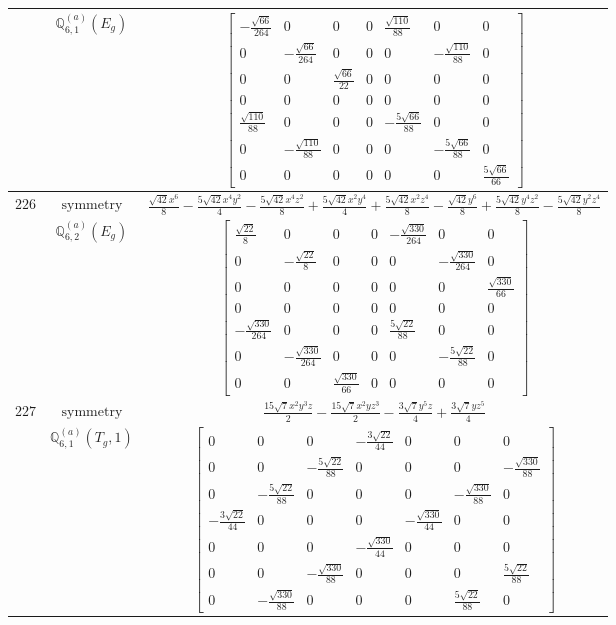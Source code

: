 \documentclass[fleqn,8pt,landscape]{jsarticle}
\begin{document}
\begin{longtable}{ccc}
$  $ & $ \mathbb{Q}_{6,1}^{(a)}(E_{g}) $ & $ \begin{bmatrix} - \frac{\sqrt{66}}{264} & 0 & 0 & 0 & \frac{\sqrt{110}}{88} & 0 & 0 \\ 0 & - \frac{\sqrt{66}}{264} & 0 & 0 & 0 & - \frac{\sqrt{110}}{88} & 0 \\ 0 & 0 & \frac{\sqrt{66}}{22} & 0 & 0 & 0 & 0 \\ 0 & 0 & 0 & 0 & 0 & 0 & 0 \\ \frac{\sqrt{110}}{88} & 0 & 0 & 0 & - \frac{5 \sqrt{66}}{88} & 0 & 0 \\ 0 & - \frac{\sqrt{110}}{88} & 0 & 0 & 0 & - \frac{5 \sqrt{66}}{88} & 0 \\ 0 & 0 & 0 & 0 & 0 & 0 & \frac{5 \sqrt{66}}{66} \end{bmatrix} $ \\ \hline
$ 226 $ & $ \text{symmetry} $ & $ \frac{\sqrt{42} x^{6}}{8} - \frac{5 \sqrt{42} x^{4} y^{2}}{4} - \frac{5 \sqrt{42} x^{4} z^{2}}{8} + \frac{5 \sqrt{42} x^{2} y^{4}}{4} + \frac{5 \sqrt{42} x^{2} z^{4}}{8} - \frac{\sqrt{42} y^{6}}{8} + \frac{5 \sqrt{42} y^{4} z^{2}}{8} - \frac{5 \sqrt{42} y^{2} z^{4}}{8} $ \\
$  $ & $ \mathbb{Q}_{6,2}^{(a)}(E_{g}) $ & $ \begin{bmatrix} \frac{\sqrt{22}}{8} & 0 & 0 & 0 & - \frac{\sqrt{330}}{264} & 0 & 0 \\ 0 & - \frac{\sqrt{22}}{8} & 0 & 0 & 0 & - \frac{\sqrt{330}}{264} & 0 \\ 0 & 0 & 0 & 0 & 0 & 0 & \frac{\sqrt{330}}{66} \\ 0 & 0 & 0 & 0 & 0 & 0 & 0 \\ - \frac{\sqrt{330}}{264} & 0 & 0 & 0 & \frac{5 \sqrt{22}}{88} & 0 & 0 \\ 0 & - \frac{\sqrt{330}}{264} & 0 & 0 & 0 & - \frac{5 \sqrt{22}}{88} & 0 \\ 0 & 0 & \frac{\sqrt{330}}{66} & 0 & 0 & 0 & 0 \end{bmatrix} $ \\ \hline
$ 227 $ & $ \text{symmetry} $ & $ \frac{15 \sqrt{7} x^{2} y^{3} z}{2} - \frac{15 \sqrt{7} x^{2} y z^{3}}{2} - \frac{3 \sqrt{7} y^{5} z}{4} + \frac{3 \sqrt{7} y z^{5}}{4} $ \\
$  $ & $ \mathbb{Q}_{6,1}^{(a)}(T_{g},1) $ & $ \begin{bmatrix} 0 & 0 & 0 & - \frac{3 \sqrt{22}}{44} & 0 & 0 & 0 \\ 0 & 0 & - \frac{5 \sqrt{22}}{88} & 0 & 0 & 0 & - \frac{\sqrt{330}}{88} \\ 0 & - \frac{5 \sqrt{22}}{88} & 0 & 0 & 0 & - \frac{\sqrt{330}}{88} & 0 \\ - \frac{3 \sqrt{22}}{44} & 0 & 0 & 0 & - \frac{\sqrt{330}}{44} & 0 & 0 \\ 0 & 0 & 0 & - \frac{\sqrt{330}}{44} & 0 & 0 & 0 \\ 0 & 0 & - \frac{\sqrt{330}}{88} & 0 & 0 & 0 & \frac{5 \sqrt{22}}{88} \\ 0 & - \frac{\sqrt{330}}{88} & 0 & 0 & 0 & \frac{5 \sqrt{22}}{88} & 0 \end{bmatrix} $ \\ \hline

\end{longtable}
\end{document}

